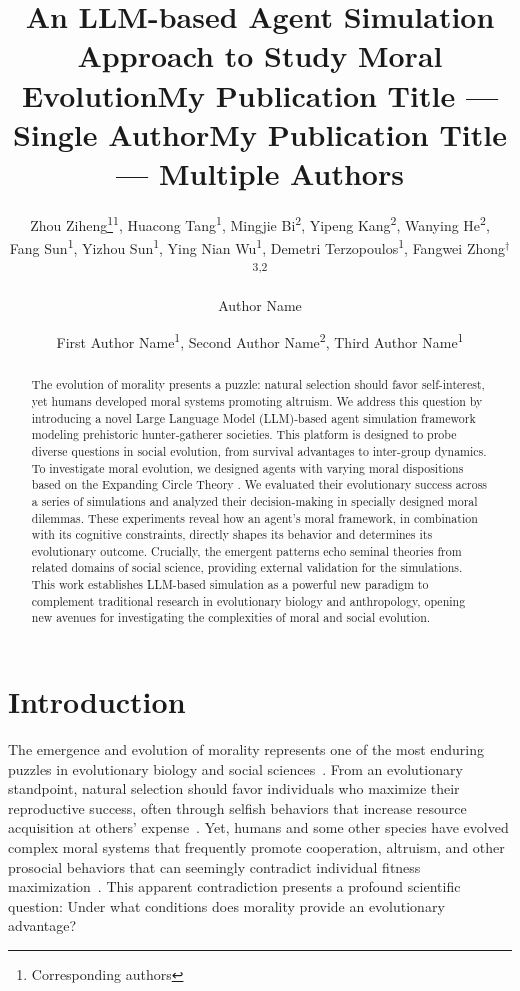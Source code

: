 \documentclass[letterpaper]{article} %
\title{An LLM-based Agent Simulation Approach to Study Moral Evolution}
\author{
    Zhou Ziheng\equalcontrib \thanks{Corresponding authors}\textsuperscript{\rm 1},
    Huacong Tang\equalcontrib\textsuperscript{\rm 1},
    Mingjie Bi\equalcontrib\textsuperscript{\rm 2},
    Yipeng Kang\textsuperscript{\rm 2},
    Wanying He\textsuperscript{\rm 2},\\
    Fang Sun\textsuperscript{\rm 1},
    Yizhou Sun\textsuperscript{\rm 1},
    Ying Nian Wu\textsuperscript{\rm 1},
    Demetri Terzopoulos\textsuperscript{\rm 1},
    Fangwei Zhong$^\dagger$\textsuperscript{\rm 3,2}
}
\title{My Publication Title --- Single Author}
\author {
    Author Name
}
\title{My Publication Title --- Multiple Authors}
\author {
    First Author Name\textsuperscript{\rm 1},
    Second Author Name\textsuperscript{\rm 2},
    Third Author Name\textsuperscript{\rm 1}
}
\begin{document}
\maketitle

\begin{abstract}
The evolution of morality presents a puzzle: natural selection should favor self-interest, yet humans developed moral systems promoting altruism. We address this question by introducing a novel Large Language Model (LLM)-based agent simulation framework modeling prehistoric hunter-gatherer societies.
This platform is designed to probe diverse questions in social evolution, from survival advantages to inter-group dynamics.
To investigate moral evolution, we designed agents with varying moral dispositions based on the Expanding Circle Theory \citep{singer1981expanding}. We evaluated their evolutionary success across a series of simulations and analyzed their decision-making in specially designed moral dilemmas. These experiments reveal how an agent's moral framework, in combination with its cognitive constraints, directly shapes its behavior and determines its evolutionary outcome. Crucially, the emergent patterns echo seminal theories from related domains of social science, providing external validation for the simulations.
This work establishes LLM-based simulation as a powerful new paradigm to complement traditional research in evolutionary biology and anthropology, opening new avenues for investigating the complexities of moral and social evolution.
\end{abstract}


\section{Introduction}

The emergence and evolution of morality represents one of the most enduring puzzles in evolutionary biology and social sciences~\citep{haidt2007moral, greene2013moral}. From an evolutionary standpoint, natural selection should favor individuals who maximize their reproductive success, often through selfish behaviors that increase resource acquisition at others' expense~\citep{dawkins1976selfish}. Yet, humans and some other species have evolved complex moral systems that frequently promote cooperation, altruism, and other prosocial behaviors that can seemingly contradict individual fitness maximization~\citep{tomasello2016natural}. This apparent contradiction presents a profound scientific question: Under what conditions does morality provide an evolutionary advantage?
\end{document}
